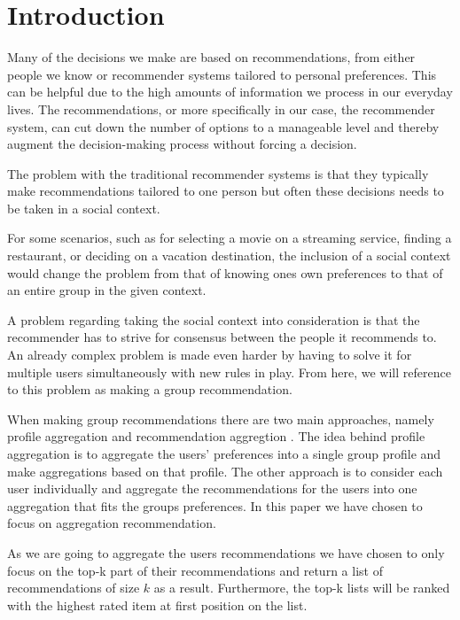 \section{Introduction}
Many of the decisions we make are based on recommendations, from either people we know or recommender systems tailored to personal preferences. This can be helpful due to the high amounts of information we process in our everyday lives\cite{Edwards2001}. The recommendations, or more specifically in our case, the recommender system, can cut down the number of options to a manageable level and thereby augment the decision-making process without forcing a decision.

The problem with the traditional recommender systems is that they typically make recommendations tailored to one person but often these decisions needs to be taken in a social context. 

For some scenarios, such as for selecting a movie on a streaming service, finding a restaurant, or deciding on a vacation destination, the inclusion of a social context would change the problem from that of knowing ones own preferences to that of an entire group in the given context.

A problem regarding taking the social context into consideration is that the recommender has to strive for consensus between the people it recommends to. An already complex problem is made even harder by having to solve it for multiple users simultaneously with new rules in play. From here, we will reference to this problem as making a group recommendation.

When making group recommendations there are two main approaches, namely profile aggregation and recommendation aggregtion \cite{profilvsrec}. The idea behind profile aggregation is to aggregate the users' preferences into a single group profile and make aggregations based on that profile. The other approach is to consider each user individually and aggregate the recommendations for the users into one aggregation that fits the groups preferences. In this paper we have chosen to focus on aggregation recommendation.


As we are going to aggregate the users recommendations we have chosen to only focus on the top-k part of their recommendations and return a list of recommendations of size $k$ as a result. Furthermore, the top-k lists will be ranked with the highest rated item at first position on the list.

